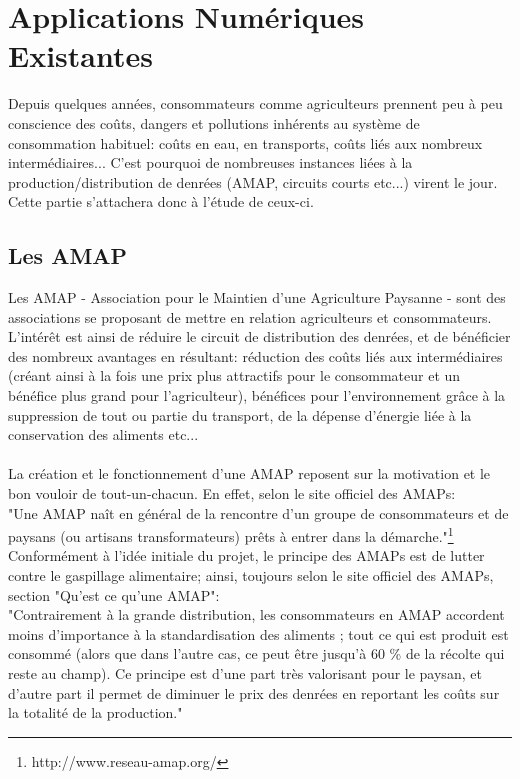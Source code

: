\chapter*{Applications Numériques Existantes}

Depuis quelques années, consommateurs comme agriculteurs prennent peu à peu conscience des coûts, dangers et pollutions inhérents au système de consommation habituel: coûts en eau, en transports, coûts liés aux nombreux intermédiaires...
C'est pourquoi de nombreuses instances liées à la production/distribution de denrées (AMAP, circuits courts etc...) virent le jour. Cette partie s'attachera donc à l'étude de ceux-ci.

\section*{Les AMAP}
Les AMAP - Association pour le Maintien d'une Agriculture Paysanne - sont des associations se proposant de mettre en relation agriculteurs et consommateurs. L'intérêt est ainsi de réduire le circuit de distribution des denrées, et de bénéficier des nombreux avantages en résultant: réduction des coûts liés aux intermédiaires (créant ainsi à la fois une prix plus attractifs pour le consommateur et un bénéfice plus grand pour l'agriculteur), bénéfices pour l'environnement grâce à la suppression de tout ou partie du transport, de la dépense d'énergie liée à la conservation des aliments etc...\\ \\
La création et le fonctionnement d'une AMAP reposent sur la motivation et le bon vouloir de tout-un-chacun. En effet, selon le site officiel des AMAPs:\\
"Une AMAP naît en général de la rencontre d'un groupe de consommateurs et de paysans (ou artisans transformateurs) prêts à entrer dans la démarche."\footnote{http://www.reseau-amap.org/}\\

Conformément à l'idée initiale du projet, le principe des AMAPs est de lutter contre le gaspillage alimentaire; ainsi, toujours selon le site officiel des AMAPs, section "Qu'est ce qu'une AMAP": \\
"Contrairement à la grande distribution, les consommateurs en AMAP accordent moins d'importance à la standardisation des aliments ; tout ce qui est produit est consommé (alors que dans l'autre cas, ce peut être jusqu'à 60 \% de la récolte qui reste au champ). Ce principe est d'une part très valorisant pour le paysan, et d'autre part il permet de diminuer le prix des denrées en reportant les coûts sur la totalité de la production."

